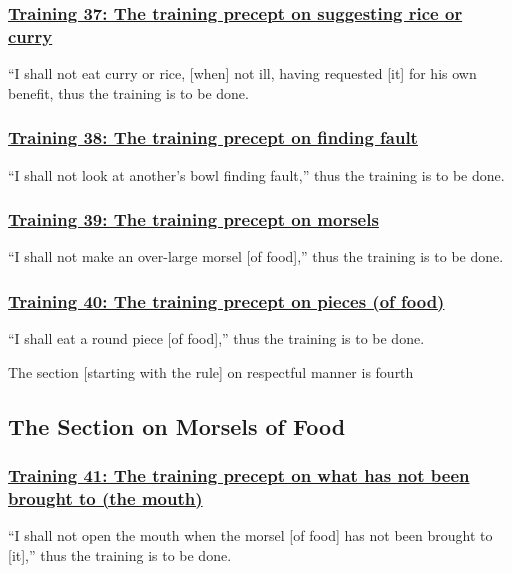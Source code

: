 \subsubsection*{\hyperref[sekh37]{Training 37: The training precept on suggesting rice or curry}}
\label{training37}
``I shall not eat curry or rice, [when] not ill, having requested [it] for his own benefit, thus the training is to be done.



\subsubsection*{\hyperref[sekh38]{Training 38: The training precept on finding fault}}
\label{training38}
``I shall not look at another's bowl finding fault,'' thus the training is to be done.



\subsubsection*{\hyperref[sekh39]{Training 39: The training precept on morsels}}
\label{training39}
``I shall not make an over-large morsel [of food],'' thus the training is to be done.



\subsubsection*{\hyperref[sekh40]{Training 40: The training precept on pieces (of food)}}
\label{training40}
``I shall eat a round piece [of food],'' thus the training is to be done.

\begin{center}
	The section [starting with the rule] on respectful manner is fourth
\end{center}



\setsubsecheadstyle{\subsectionFmt}
\subsection{The Section on Morsels of Food}
\label{trainings-vagga5}

\subsubsection*{\hyperref[sekh41]{Training 41: The training precept on what has not been brought to (the mouth)}}
\label{training41}
``I shall not open the mouth when the morsel [of food] has not been brought to [it],'' thus the training is to be done.



